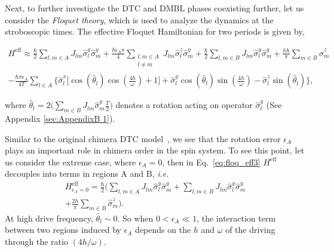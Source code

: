 \documentclass[%
reprint,
superscriptaddress,
amsmath,amssymb,showkeys,
aps,
prb,
]{revtex4-2}
\begin{document}
	Next, to further investigate the DTC and DMBL phases coexisting further, let us consider the \textit{Floquet theory}, which is used to analyze the dynamics at the stroboscopic times. The effective Floquet Hamiltonian for two periods is given by,
	\begin{widetext}
		\begin{multline}
			H^{\mathrm{eff}} \approx\frac{\hbar}{2} \sum_{l,m\in A}J_{lm}\hat{\sigma}_l^y\hat{\sigma}_m^y +\frac{\hbar \epsilon_A \pi}{4} \sum_{\substack{l,m\in A\\l\neq m}} J_{lm}\hat{\sigma}^z_l\hat{\sigma}^y_m + \frac{\hbar}{2}\sum_{l,m\in B}J_{lm}\hat{\sigma}_l^y \hat{\sigma}_m^y + \frac{h\hbar}{\pi}\sum_{m \in B}\hat{\sigma}^z_m \\ -\frac{\hbar \pi \epsilon_A}{4T}\sum_{l\in A}\Bigg\{\hat{\sigma}^x_l \bigg[\cos(\hat{\theta}_l)\cos(\frac{4h}{\omega})+1 \bigg] + \hat{\sigma}^y_l \cos(\hat{\theta}_l)\sin(\frac{4h}{\omega})-\hat{\sigma}^z_l \sin(\hat{\theta}_l)\Bigg\},
		\label{eq:floq_eff3}
		\end{multline}
	\end{widetext}

	where $\displaystyle \hat{\theta}_l = 2 \Big(\sum_{m \in B}J_{lm}\hat{\sigma}^y_m \frac{T}{2} \Big)$ denotes a rotation acting on operator $\hat{\sigma}^y_l$ (See Appendix \ref{sec:AppendixB	1}).
	
	Similar to the original chimera DTC model~\cite{sakurai_phys_nodate}, we see that the rotation error $\epsilon_A$ plays an important role in chimera order in the spin system. To see this point, let us consider the extreme case, where $\epsilon_A=0$, then in Eq.~\eqref{eq:floq_eff3}  $H^\mathrm{eff}$ decouples into terms in regions A and B, \textit{i.e.}
	\begin{multline}
		H^{\mathrm{eff}}_{\epsilon_A=0} =  \frac{\hbar}{2}\Bigg( \sum_{l,m\in A} J_{lm} \hat{\sigma}^y_l\hat{\sigma}^y_m +\sum_{l,m\in B} J_{lm} \hat{\sigma}^y_l\hat{\sigma}^y_m\\+\frac{2h }{\pi}\sum_{m \in B}\hat{\sigma}^z_m\Bigg).
	\end{multline}
	At high drive  frequency, $\hat{\theta}_l \sim 0$. So when $0<\epsilon_A \ll 1$, the interaction term between two regions induced by $\epsilon_A$ depends on the $h$ and $\omega$ of the driving through the ratio $(4h/\omega)$. 
	
\end{document}
